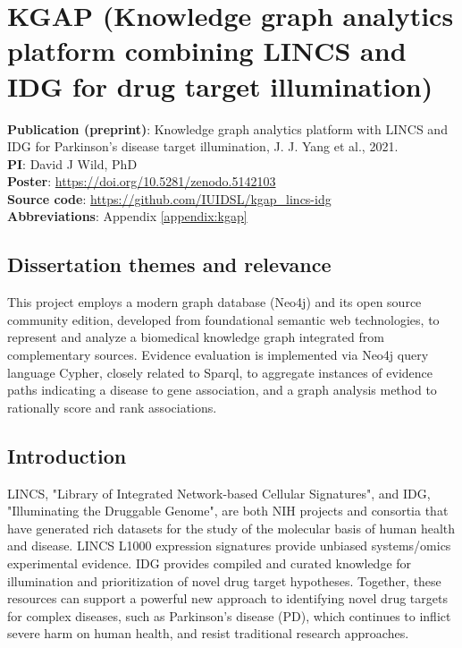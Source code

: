 \chapter{KGAP (Knowledge graph analytics platform combining LINCS and IDG for drug target illumination)}

\textbf{Publication (preprint)}: Knowledge graph analytics platform with LINCS and IDG for Parkinson’s disease target illumination, J. J. Yang et al., 2021\cite{Yang2021-yv}.\\
\textbf{PI}: David J Wild, PhD\\
\textbf{Poster}: \href{https://doi.org/10.5281/zenodo.5142103}{https://doi.org/10.5281/zenodo.5142103}\\
\textbf{Source code}: \href{https://github.com/IUIDSL/kgap\_lincs-idg}{https://github.com/IUIDSL/kgap\_lincs-idg}\\
\textbf{Abbreviations}: Appendix \ref{appendix:kgap}

\section{Dissertation themes and relevance}

This project employs a modern graph database (Neo4j) and its open source community edition, developed from foundational semantic web technologies, to represent and analyze a biomedical knowledge graph integrated from complementary sources. Evidence evaluation is implemented via Neo4j query language Cypher, closely related to Sparql, to aggregate instances of 
evidence paths indicating a disease to gene association, and a graph analysis method to rationally score and rank associations.

\section{Introduction}

LINCS, "Library of Integrated Network-based Cellular Signatures", and IDG, "Illuminating the Druggable Genome", are both NIH projects and consortia that have generated rich datasets for the study of the molecular basis of human health and disease.  LINCS L1000 expression signatures provide unbiased systems/omics experimental evidence. IDG provides compiled and curated knowledge for illumination and prioritization of novel drug target hypotheses. Together, these resources can support a powerful new approach to identifying novel drug targets for complex diseases, such as Parkinson's disease (PD), which continues to inflict severe harm on human health, and resist traditional research approaches.

